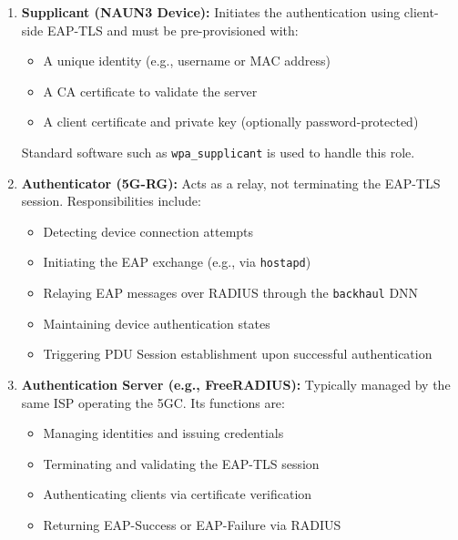 \begin{enumerate}
    \item {
        \textbf{Supplicant (\ac{NAUN3} Device):} Initiates the authentication using client-side \ac{EAP-TLS} and must be pre-provisioned with:
        \begin{itemize}
            \item A unique identity (e.g., username or \ac{MAC} address)
            \item A \ac{CA} certificate to validate the server
            \item A client certificate and private key (optionally password-protected)
        \end{itemize}
        Standard software such as \texttt{wpa\_supplicant} is used to handle this role.
    }
    \item {
        \textbf{Authenticator (\ac{5G-RG}):} Acts as a relay, not terminating the \ac{EAP-TLS} session. Responsibilities include:
        \begin{itemize}
            \item Detecting device connection attempts
            \item Initiating the \ac{EAP} exchange (e.g., via \texttt{hostapd})
            \item Relaying \ac{EAP} messages over \ac{RADIUS} through the \texttt{backhaul} \ac{DNN}
            \item Maintaining device authentication states
            \item Triggering \ac{PDU} Session establishment upon successful authentication
        \end{itemize}
    }
    \item {
        \textbf{Authentication Server (e.g., FreeRADIUS):} Typically managed by the same \ac{ISP} operating the \ac{5GC}. Its functions are:
        \begin{itemize}
            \item Managing identities and issuing credentials
            \item Terminating and validating the \ac{EAP-TLS} session
            \item Authenticating clients via certificate verification
            \item Returning \ac{EAP}-Success or \ac{EAP}-Failure via \ac{RADIUS}
        \end{itemize}
    }
\end{enumerate}

